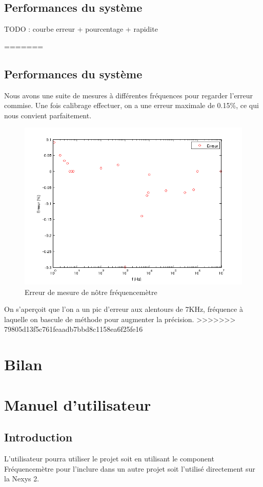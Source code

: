 \documentclass[a4paper,11pt]{article}
\begin{document}
  
\subsection{Performances du système}
TODO : courbe erreur + pourcentage + rapidite 


=======
\subsection{Performances du système}
Nous avons une suite de mesures à différentes fréquences pour regarder l'erreur commise. Une fois calibrage effectuer, on a une erreur maximale
de 0.15\%, ce qui nous convient parfaitement.  
\begin{figure}[H]
\begin{center}
	\includegraphics[scale=.7]{mesure_erreur.png}
	\caption{Erreur de mesure de nôtre fréquencemètre}
\end{center}
\end{figure}
On s'aperçoit que l'on a un pic d'erreur aux alentours de 7KHz, fréquence à laquelle on bascule de méthode pour augmenter la précision.
>>>>>>> 79805d13f5c761feaadb7bbd8c1158ea6f25fe16
\newpage
\section{Bilan}

\newpage
\appendix
\section{Manuel d'utilisateur}
\subsection{Introduction}
L'utilisateur pourra utiliser le projet soit en utilisant le component Fréquencemètre pour l'inclure dans un autre projet soit l'utilisé directement sur la Nexys 2.
\end{document}
